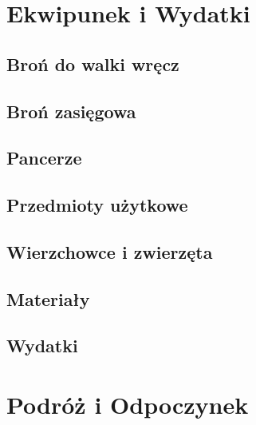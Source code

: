 \documentclass[10pt,a4paper]{book}
\begin{document}
\section{Ekwipunek i Wydatki}
\begin{multicols}{2}

\subsection*{Broń do walki wręcz}


\subsection*{Broń zasięgowa}


\subsection*{Pancerze}


\subsection*{Przedmioty użytkowe}


\subsection*{Wierzchowce i zwierzęta}


\subsection*{Materiały}


\subsection*{Wydatki}


\end{multicols}


\section{Podróż i Odpoczynek}
\end{document}
